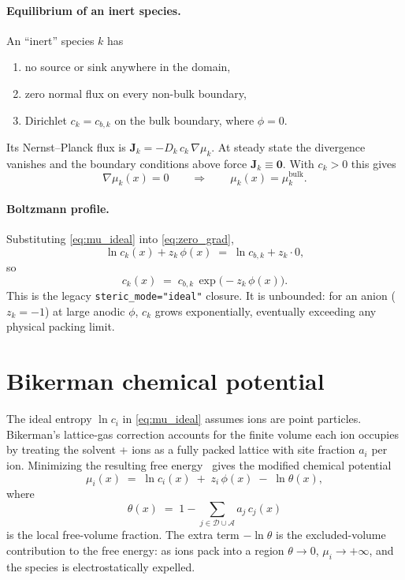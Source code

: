 \documentclass[11pt]{article}
\newcommand{\dynset}{\mathcal{D}}      %
\newcommand{\anset}{\mathcal{A}}       %
\begin{document}
\paragraph{Equilibrium of an inert species.}
An ``inert'' species $k$ has
\begin{enumerate}
\item no source or sink anywhere in the domain,
\item zero normal flux on every non-bulk boundary,
\item Dirichlet $c_k = c_{b,k}$ on the bulk boundary, where $\phi = 0$.
\end{enumerate}
Its Nernst--Planck flux is $\mathbf{J}_k = -D_k\,c_k\,\nabla \mu_k$.
At steady state the divergence vanishes and the boundary conditions
above force $\mathbf{J}_k \equiv \mathbf{0}$. With $c_k > 0$ this gives
\begin{equation}
\nabla \mu_k(x) = 0
\qquad\Longrightarrow\qquad
\mu_k(x) = \mu_k^{\mathrm{bulk}}.
\label{eq:zero_grad}
\end{equation}

\paragraph{Boltzmann profile.}
Substituting \eqref{eq:mu_ideal} into \eqref{eq:zero_grad},
\begin{equation}
\ln c_k(x) + z_k\,\phi(x) \;=\; \ln c_{b,k} + z_k\cdot 0,
\end{equation}
so
\begin{equation}
\boxed{\;c_k(x) \;=\; c_{b,k}\,\exp\!\bigl(-z_k\,\phi(x)\bigr).\;}
\label{eq:boltzmann_ideal}
\end{equation}
This is the legacy \texttt{steric\_mode="ideal"} closure. It is unbounded:
for an anion ($z_k=-1$) at large anodic $\phi$, $c_k$ grows
exponentially, eventually exceeding any physical packing limit.

\section{Bikerman chemical potential}

The ideal entropy $\ln c_i$ in \eqref{eq:mu_ideal} assumes ions are point
particles. Bikerman's lattice-gas correction accounts for the finite
volume each ion occupies by treating the solvent + ions as a fully
packed lattice with site fraction $a_i$ per ion. Minimizing the
resulting free energy~\cite{Tresset2008} gives the modified chemical
potential
\begin{equation}
\mu_i(x) \;=\; \ln c_i(x) \;+\; z_i\,\phi(x) \;-\; \ln\theta(x),
\label{eq:mu_bikerman}
\end{equation}
where
\begin{equation}
\theta(x) \;=\; 1 - \sum_{j\in\dynset\cup\anset} a_j\,c_j(x)
\label{eq:theta_def}
\end{equation}
is the local free-volume fraction. The extra term $-\ln\theta$ is the
excluded-volume contribution to the free energy: as ions pack into a
region $\theta \to 0$, $\mu_i\to +\infty$, and the species is
electrostatically expelled.
\end{document}
